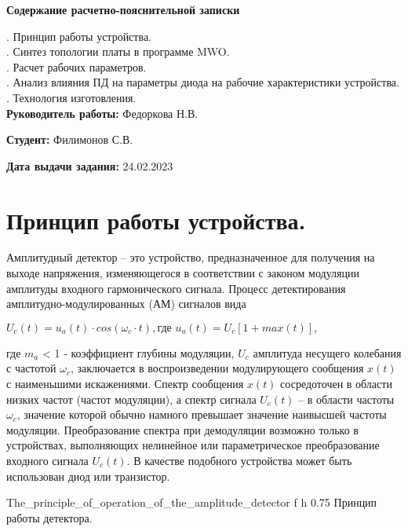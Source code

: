 \documentclass{bmstu}
\begin{document}
\noindent \textbf{Содержание расчетно-пояснительной записки}
	
. Принцип работы устройства. \\
. Синтез топологии платы в программе MWO.  \\
. Расчет рабочих параметров. \\
. Анализ влияния ПД на параметры диода на рабочие характеристики устройства.\\
. Технология изготовления.\\
	
\noindent \textbf{Руководитель работы:} Федоркова Н.В.
	
\noindent \textbf{Студент:} Филимонов С.В.
	
\noindent \textbf{Дата выдачи задания:} 24.02.2023
	
	
	\chapter{Принцип работы устройства.}
	
	Амплитудный детектор – это устройство, предназначенное для получения на
	выходе напряжения, изменяющегося в соответствии с законом модуляции
	амплитуды входного гармонического сигнала. Процесс детектирования
	амплитудно-модулированных (АМ) сигналов вида
	
	\begin{center}
		 $U_c(t) = u_a(t) \cdot cos(\omega _c \cdot t), \text{где } u_a(t)=U_c[1 + max(t)],$
	\end{center}
	
	где $m_a$ < 1 - коэффициент глубины модуляции, $U_c$ амплитуда несущего 
	колебания с частотой $\omega _c$, заключается в воспроизведении модулирующего 
	сообщения $x(t)$ с наименьшими искажениями. Спектр сообщения $x(t)$ 
	сосредоточен в области низких частот (частот модуляции), а спектр сигнала 
	$U_c(t)$ – в области частоты $\omega _c$, значение которой обычно намного 
	превышает значение наивысшей частоты модуляции. Преобразование спектра при 
	демодуляции возможно только в устройствах, выполняющих нелинейное или 
	параметрическое преобразование входного сигнала $U_c(t)$. В качестве подобного 
	устройства может быть использован диод или транзистор.
	
		{The_principle_of_operation_of_the_amplitude_detector}
		{f} %
		{h} %
		{0.75\textwidth} %
		{Принцип работы детектора.} %
	
\end{document}
